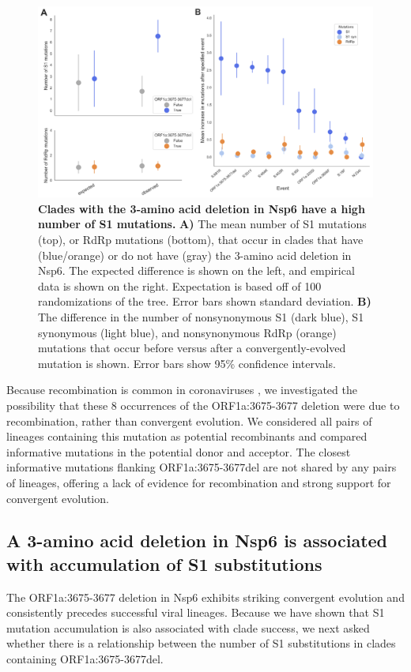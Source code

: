 \documentclass[11pt,oneside,letterpaper]{article}
\begin{document}
\begin{figure}[h!]
	\centerline{\includegraphics[width=1.0\textwidth]{fig5_nsp6s1.png}}
	\caption{\textbf{Clades with the 3-amino acid deletion in Nsp6 have a high number of S1 mutations.}
	\textbf{A)} The mean number of S1 mutations (top), or RdRp mutations (bottom), that occur in clades that have (blue/orange) or do not have (gray) the 3-amino acid deletion in Nsp6.
	The expected difference is shown on the left, and empirical data is shown on the right.
	Expectation is based off of 100 randomizations of the tree. Error bars shown standard deviation.
	\textbf{B)} The difference in the number of nonsynonymous S1 (dark blue), S1 synonymous (light blue), and nonsynonymous RdRp (orange) mutations that occur before versus after a convergently-evolved mutation is shown.
	Error bars show 95\% confidence intervals.
	}
	\label{fig:nsp6s1}
\end{figure}

Because recombination is common in coronaviruses \cite{Muller2021-qq, Turkahia2021-ao}, we investigated the possibility that these 8 occurrences of the ORF1a:3675-3677 deletion were due to recombination, rather than convergent evolution.
We considered all pairs of lineages containing this mutation as potential recombinants and compared informative mutations in the potential donor and acceptor.
The closest informative mutations flanking ORF1a:3675-3677del are not shared by any pairs of lineages, offering a lack of evidence for recombination and strong support for convergent evolution.

\subsection*{A 3-amino acid deletion in Nsp6 is associated with accumulation of S1 substitutions}
The ORF1a:3675-3677 deletion in Nsp6 exhibits striking convergent evolution and consistently precedes successful viral lineages. Because we have shown that S1 mutation accumulation is also associated with clade success, we next asked whether there is a relationship between the number of S1 substitutions in clades containing ORF1a:3675-3677del.
\end{document}

